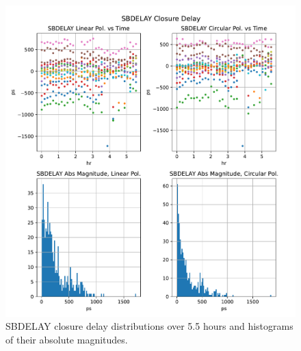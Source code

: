 \documentclass[letterpaper,twoside,12pt]{article}
\begin{document}
\begin{figure}[ht!]
  \begin{center}
  \includegraphics[width=38pc]{SBDELAY_Closure_Delay.pdf}
  \caption{\small SBDELAY closure delay distributions over 5.5 hours and histograms of their absolute magnitudes.}
  \label{sbd}
  \end{center}
\end{figure}
\end{document}
